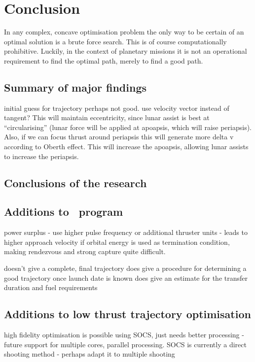 \chapter{Conclusion} \label{cha:Conclusion}

In any complex, concave optimisation problem the only way to be certain of an optimal solution is a brute force search. This is of course computationally prohibitive. Luckily, in the context of planetary missions it is not an operational requirement to find the optimal path, merely to find a good path. 

\section{Summary of major findings}
initial guess for trajectory perhaps not good. use velocity vector instead of tangent? This will maintain eccentricity, since lunar assist is best at \enquote{circularising} (lunar force will be applied at apoapsis, which will raise periapsis).
Also, if we can focus thrust around periapsis this will generate more delta v according to Oberth effect. This will increase the apoapsis, allowing lunar assists to increase the periapsis.

\section{Conclusions of the research}

\section{Additions to \BW\ program} \label{sec:BW1-additions}
power surplus - use higher pulse frequency or additional thruster units - leads to higher approach velocity if orbital energy is used as termination condition, making rendezvous and strong capture quite difficult.

doesn't give a complete, final trajectory
does give a procedure for determining a good trajectory once launch date is known
does give an estimate for the transfer duration and fuel requirements

\section{Additions to low thrust trajectory optimisation} \label{sec:Optimisation-additions}

high fidelity optimisation is possible using SOCS, just needs better processing - future support for multiple cores, parallel processing. SOCS is currently a direct shooting method - perhaps adapt it to multiple shooting

